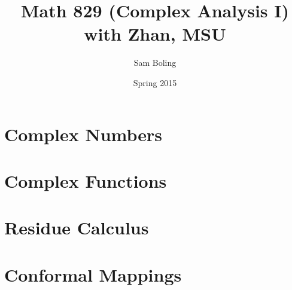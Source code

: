 \documentclass{report}
\title{Math 829 (Complex Analysis I) with Zhan, MSU}
\author{Sam Boling}
\date{Spring 2015}
\begin{document}
\maketitle

\chapter{Complex Numbers}



\chapter{Complex Functions}







\chapter{Residue Calculus}





\chapter{Conformal Mappings}

\end{document}
